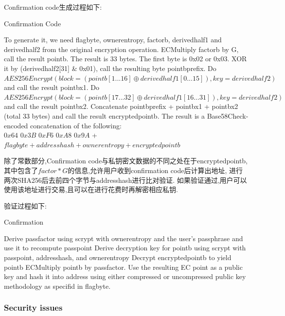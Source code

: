 Confirmation code生成过程如下:

\begin{algorithm}[tbp]\footnotesize
\caption{Confirmation Code}
  	\begin{algorithmic}[1]
	   \STATE To generate it, we need flagbyte, ownerentropy, factorb, derivedhalf1 and 
	   derivedhalf2 from the original encryption operation.
		\STATE ECMultiply factorb by G, call the result pointb. The result is 33 bytes.
		\STATE The first byte is 0x02 or 0x03. XOR it by (derivedhalf2[31] \& 0x01), call 
		the resulting byte pointbprefix.
		\STATE Do $AES256Encrypt(block = (pointb[1...16] \oplus derivedhalf1[0...15]), 
		key = derivedhalf2)$ and call the result pointbx1.
		\STATE Do $AES256Encrypt(block = (pointb[17...32] \oplus derivedhalf1[16...31]),
		 key = derivedhalf2)$ and call the result pointbx2.
		\STATE Concatenate pointbprefix + pointbx1 + pointbx2 (total 33 bytes) 
		and call the result encryptedpointb.  
		\STATE The result is a Base58Check-encoded concatenation of the following: \\ 
		 $0x64$ $0x3B$ $0xF6$ $0xA8$ $0x9A$ + $flagbyte + addresshash + ownerentropy + 
		 encryptedpointb$
    \end{algorithmic}
\end{algorithm}

除了常数部分,Confirmation code与私钥密文数据的不同之处在于encryptedpointb,
其中包含了$factor*G$的信息,允许用户收到confirmation code后计算出地址,
进行两次SHA256后去前四个字节与addresshash进行比对验证.
如果验证通过,用户可以使用该地址进行交易,且可以在进行花费时再解密相应私钥.

验证过程如下:

\begin{algorithm}[tbp]\footnotesize
\caption{Confirmation}
  	\begin{algorithmic}[1]
	   \STATE Derive passfactor using scrypt with ownerentropy and 
	   the user's passphrase and use it to recompute passpoint
		\STATE Derive decryption key for pointb using scrypt with 
		passpoint, addresshash, and ownerentropy
		\STATE Decrypt encryptedpointb to yield pointb
		\STATE ECMultiply pointb by passfactor. Use the resulting 
		EC point as a public key and hash it into address using either 
		compressed or  uncompressed public key methodology as specifid in flagbyte.
    \end{algorithmic}
\end{algorithm}


\subsubsection{ Security issues}

